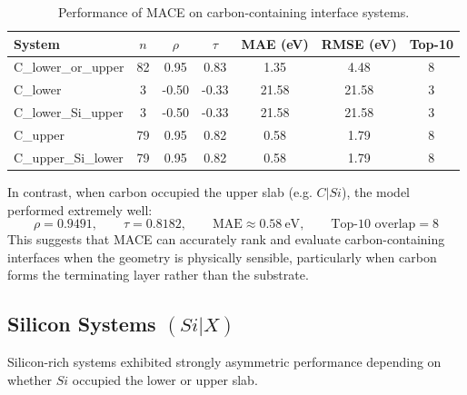 \begin{table}[H]
\centering
\begin{tabular}{lcccccc}
\toprule
             System &  $n$ &  $\rho$ &  $\tau$ &  MAE (eV) &  RMSE (eV) &  Top-10 \\
\midrule
C\_lower\_or\_upper &   82 &    0.95 &    0.83 &      1.35 &       4.48 &       8 \\
           C\_lower &    3 &   -0.50 &   -0.33 &     21.58 &      21.58 &       3 \\
C\_lower\_Si\_upper &    3 &   -0.50 &   -0.33 &     21.58 &      21.58 &       3 \\
           C\_upper &   79 &    0.95 &    0.82 &      0.58 &       1.79 &       8 \\
C\_upper\_Si\_lower &   79 &    0.95 &    0.82 &      0.58 &       1.79 &       8 \\
\bottomrule
\end{tabular}
\caption{Performance of MACE on carbon-containing interface systems.}
\label{tab:carbon_systems}
\end{table}

In contrast, when carbon occupied the upper slab (e.g. $C|Si$), the model performed extremely well:
\begin{equation}
    \rho = 0.9491, \qquad \tau = 0.8182, \qquad \text{MAE} \approx 0.58~\text{eV}, \qquad \text{Top-10 overlap} = 8
\end{equation}
This suggests that MACE can accurately rank and evaluate carbon-containing interfaces when the geometry is physically sensible, particularly when carbon forms the terminating layer rather than the substrate.

\newpage \subsection*{Silicon Systems $(Si|X)$}

Silicon-rich systems exhibited strongly asymmetric performance depending on whether $Si$ occupied the lower or upper slab.

